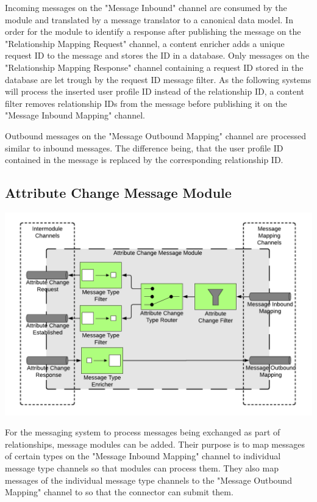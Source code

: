 Incoming messages on the "Message Inbound" channel are consumed by the module and translated by a message translator to a canonical data model. In order for the module to identify a response after publishing the message on the "Relationship Mapping Request" channel, a content enricher adds a unique request ID to the message and stores the ID in a database. Only messages on the "Relationship Mapping Response" channel containing a request ID stored in the database are let trough by the request ID message filter. As the following systems will process the inserted user profile ID instead of the relationship ID, a content filter removes relationship IDs from the message before publishing it on the "Message Inbound Mapping" channel.

Outbound messages on the "Message Outbound Mapping" channel are processed similar to inbound messages. The difference being, that the user profile ID contained in the message is replaced by the corresponding relationship ID.

\subsection{Attribute Change Message Module}

\begin{center}
    \includegraphics[scale=0.6]{Diagrams/Integration Architecture 1/Technological Integration/11. Attribute Change Message Module.pdf}
\end{center}

For the messaging system to process messages being exchanged as part of relationships, message modules can be added. Their purpose is to map messages of certain types on the "Message Inbound Mapping" channel to individual message type channels so that modules can process them. They also map messages of the individual message type channels to the "Message Outbound Mapping" channel to so that the connector can submit them.

